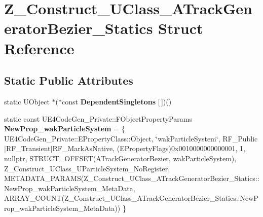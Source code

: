 \hypertarget{struct_z___construct___u_class___a_track_generator_bezier___statics}{}\section{Z\+\_\+\+Construct\+\_\+\+U\+Class\+\_\+\+A\+Track\+Generator\+Bezier\+\_\+\+Statics Struct Reference}
\label{struct_z___construct___u_class___a_track_generator_bezier___statics}
\subsection*{Static Public Attributes}
\begin{DoxyCompactItemize}
\item 
\mbox{\label{struct_z___construct___u_class___a_track_generator_bezier___statics_a4d54fe9bd24f79d3ec74e714664ccdbb}} 
static U\+Object $\ast$($\ast$const {\bfseries Dependent\+Singletons} \mbox{[}$\,$\mbox{]})()
\item 
\mbox{\label{struct_z___construct___u_class___a_track_generator_bezier___statics_a45ad320c771e0090b9c939d7ebab3a3e}} 
static const U\+E4\+Code\+Gen\+\_\+\+Private\+::\+F\+Object\+Property\+Params {\bfseries New\+Prop\+\_\+wak\+Particle\+System} = \{ U\+E4\+Code\+Gen\+\_\+\+Private\+::\+E\+Property\+Class\+::\+Object, \char`\"{}wak\+Particle\+System\char`\"{}, R\+F\+\_\+\+Public$\vert$R\+F\+\_\+\+Transient$\vert$R\+F\+\_\+\+Mark\+As\+Native, (E\+Property\+Flags)0x0010000000000001, 1, nullptr, S\+T\+R\+U\+C\+T\+\_\+\+O\+F\+F\+S\+E\+T(\+A\+Track\+Generator\+Bezier, wak\+Particle\+System), Z\+\_\+\+Construct\+\_\+\+U\+Class\+\_\+\+U\+Particle\+System\+\_\+\+No\+Register, M\+E\+T\+A\+D\+A\+T\+A\+\_\+\+P\+A\+R\+A\+M\+S(\+Z\+\_\+\+Construct\+\_\+\+U\+Class\+\_\+\+A\+Track\+Generator\+Bezier\+\_\+\+Statics\+::\+New\+Prop\+\_\+wak\+Particle\+System\+\_\+\+Meta\+Data, A\+R\+R\+A\+Y\+\_\+\+C\+O\+U\+N\+T(\+Z\+\_\+\+Construct\+\_\+\+U\+Class\+\_\+\+A\+Track\+Generator\+Bezier\+\_\+\+Statics\+::\+New\+Prop\+\_\+wak\+Particle\+System\+\_\+\+Meta\+Data)) \}
\item 
\mbox{\label{struct_z___construct___u_class___a_track_generator_bezier___statics_ad71f6278a5f5862eac78112f89ca7fc4}} 

\end{DoxyCompactItemize}
